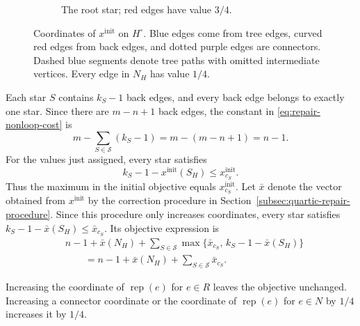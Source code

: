\documentclass[11pt]{amsart}
\newcommand{\rep}[1]{\operatorname{rep}(#1)}
\newcommand{\1}{\mathbbm{1}}
\begin{document}
\begin{figure}[H]
\begin{subfigure}[t]{.34\textwidth}
\caption{The root star; red edges have value $3/4$.}
\end{subfigure}
\caption{Coordinates of $x^{\mathrm{init}}$ on $H^\circ$. Blue edges come from tree
edges, curved red edges from back edges, and dotted purple edges are connectors.
Dashed blue segments denote tree paths with omitted intermediate vertices.
Every edge in $N_H$ has value $1/4$.}
\label{fig:quartic-initial}
\end{figure}
Each star $S$ contains $k_S-1$ back edges, and every back
edge belongs to exactly one star. Since there are $m-n+1$
back edges, the constant in \eqref{eq:repair-nonloop-cost} is
\[
 m-\sum_{S\in\mathcal S}(k_S-1)
 =m-(m-n+1)=n-1.
\]
For the values just assigned, every star satisfies
\[
 k_S-1-x^{\mathrm{init}}(S_H)\le x^{\mathrm{init}}_{c_S}.
\]
Thus the maximum in the initial objective equals
$x^{\mathrm{init}}_{c_S}$. Let $\bar x$ denote the vector
obtained from $x^{\mathrm{init}}$ by the correction procedure
in Section~\ref{subsec:quartic-repair-procedure}.
Since this procedure only increases coordinates, every star
satisfies $k_S-1-\bar x(S_H)\le\bar x_{c_S}$.
Its objective expression is
\begin{equation}
\label{eq:quartic-objective}
 \begin{aligned}
 &n-1+\bar x(N_H)+\sum_{S\in\mathcal S}
   \max\{\bar x_{c_S},\,k_S-1-\bar x(S_H)\}\\
 &\qquad=n-1+\bar x(N_H)+\sum_{S\in\mathcal S}\bar x_{c_S}.
 \end{aligned}
\end{equation}

Increasing
the coordinate of $\rep{e}$ for $e\in R$ leaves the objective
unchanged. Increasing a connector coordinate or the coordinate
of $\rep{e}$ for $e\in N$ by $1/4$ increases it by $1/4$.
\end{document}
